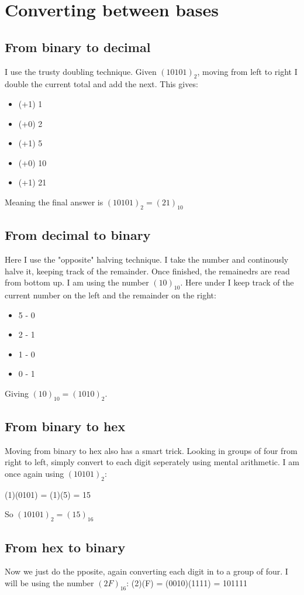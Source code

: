 \documentclass{article}
\begin{document}
\section{Converting between bases}

\subsection{From binary to decimal}
I use the trusty doubling technique. Given $(10101)_2$, moving from left to right I double the current total and add the next. This gives:
\begin{itemize}
    \item{(+1) 1}
    \item{(+0) 2}
    \item{(+1) 5}
    \item{(+0) 10}
    \item{(+1) 21}
\end{itemize}
Meaning the final answer is $(10101)_2 = (21)_{10}$

\subsection{From decimal to binary}
Here I use the "opposite" halving technique. I take the number and continously halve it, keeping track of the remainder. Once finished, the remainedrs are read from bottom up.
I am using the number $(10)_{10}$. Here under I keep track of the current number on the left and the remainder on the right:
\begin{itemize}
    \item{5 - 0}
    \item{2 - 1}
    \item{1 - 0}
    \item{0 - 1}
\end{itemize}
Giving $(10)_{10} = (1010)_2$.

\subsection{From binary to hex}
Moving from binary to hex also has a smart trick. Looking in groups of four from right to left, simply convert to each digit seperately using mental arithmetic.
I am once again using $(10101)_2$:

(1)(0101) = (1)(5) = 15

So $(10101)_2 = (15)_{16}$

\subsection{From hex to binary}
Now we just do the pposite, again converting each digit in to a group of four. I will be using the number $(2F)_{16}$:
(2)(F) = (0010)(1111) = 101111
\end{document}
